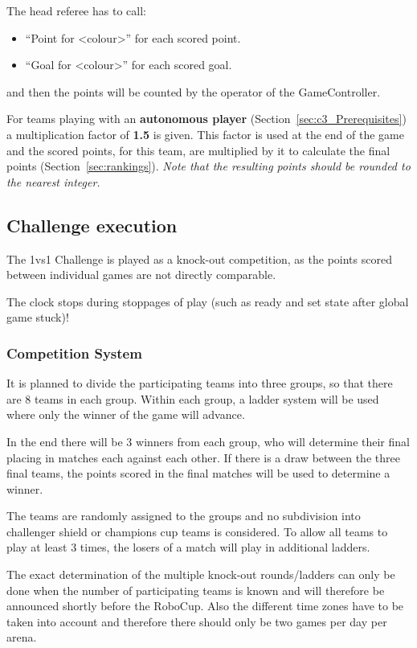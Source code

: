 The head referee has to call:
\begin{itemize}
	\item ``Point for \textless colour\textgreater'' for each scored point.
	\item ``Goal for \textless colour\textgreater'' for each scored goal.
\end{itemize}
and then the points will be counted by the operator of the GameController.

For teams playing with an \textbf{autonomous player} (\cf Section~\ref{sec:c3_Prerequisites}) a multiplication factor of \textbf{1.5} is given. This factor is used at the end of the game and the scored points, for this team, are multiplied by it to calculate the final points (\cf Section~\ref{sec:rankings}). \emph{Note that the resulting points should be rounded to the nearest integer.}

\subsection{Challenge execution}
The 1vs1 Challenge is played as a knock-out competition, as the points scored between individual games are not directly comparable. 

The clock stops during stoppages of play (such as ready and set state after global game stuck)!

\subsubsection{Competition System}
It is planned to divide the participating teams into three groups, so that there are 8 teams in each group. Within each group, a ladder system will be used where only the winner of the game will advance. 

In the end there will be 3 winners from each group, who will determine their final placing in matches each against each other. If there is a draw between the three final teams, the points scored in the final matches will be used to determine a winner.

The teams are randomly assigned to the groups and no subdivision into challenger shield or champions cup teams is considered.
To allow all teams to play at least 3 times, the losers of a match will play in additional ladders.

The exact determination of the multiple knock-out rounds/ladders can only be done when the number of participating teams is known and will therefore be announced shortly before the RoboCup. Also the different time zones have to be taken into account and therefore there should only be two games per day per arena.
    
